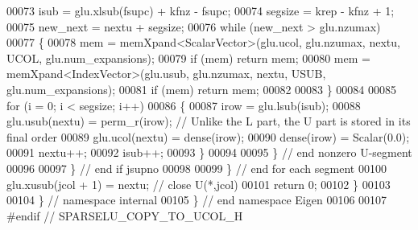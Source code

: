 \begin{DoxyCode}
00073         isub = glu.xlsub(fsupc) + kfnz - fsupc; 
00074         segsize = krep - kfnz + 1; 
00075         new\_next = nextu + segsize; 
00076         \textcolor{keywordflow}{while} (new\_next > glu.nzumax) 
00077         \{
00078           mem = memXpand<ScalarVector>(glu.ucol, glu.nzumax, nextu, UCOL, glu.num\_expansions); 
00079           \textcolor{keywordflow}{if} (mem) \textcolor{keywordflow}{return} mem; 
00080           mem = memXpand<IndexVector>(glu.usub, glu.nzumax, nextu, USUB, glu.num\_expansions); 
00081           \textcolor{keywordflow}{if} (mem) \textcolor{keywordflow}{return} mem; 
00082           
00083         \}
00084         
00085         \textcolor{keywordflow}{for} (i = 0; i < segsize; i++)
00086         \{
00087           irow = glu.lsub(isub); 
00088           glu.usub(nextu) = perm\_r(irow); \textcolor{comment}{// Unlike the L part, the U part is stored in its final order}
00089           glu.ucol(nextu) = dense(irow); 
00090           dense(irow) = Scalar(0.0); 
00091           nextu++;
00092           isub++;
00093         \}
00094         
00095       \} \textcolor{comment}{// end nonzero U-segment }
00096       
00097     \} \textcolor{comment}{// end if jsupno }
00098     
00099   \} \textcolor{comment}{// end for each segment}
00100   glu.xusub(jcol + 1) = nextu; \textcolor{comment}{// close U(*,jcol)}
00101   \textcolor{keywordflow}{return} 0; 
00102 \}
00103 
00104 \} \textcolor{comment}{// namespace internal}
00105 \} \textcolor{comment}{// end namespace Eigen}
00106 
00107 \textcolor{preprocessor}{#endif // SPARSELU\_COPY\_TO\_UCOL\_H}
\end{DoxyCode}
